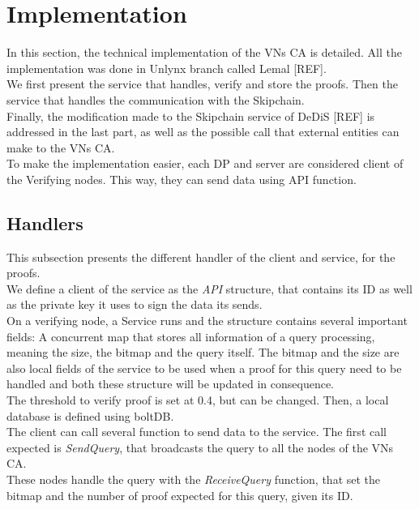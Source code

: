 \documentclass{article}
\begin{document}
\section{Implementation}
In this section, the technical implementation of the VNs CA is detailed. All the implementation was done in Unlynx branch called Lemal [REF].\\
We first present the service that handles, verify and store the proofs. Then the service that handles the communication with the Skipchain.\\
Finally, the modification made to the Skipchain service of DeDiS [REF] is addressed in the last part, as well as the possible call that external entities can make to the VNs CA.\\

To make the implementation easier, each DP and server are considered client of the Verifying nodes. This way, they can send data using API function.\\

\subsection{Handlers}
This subsection presents the different handler of the client and service, for the proofs.\\

We define a client of the service as the \textit{API} structure, that contains its ID as well as the private key it uses to sign the data its sends.\\
On a verifying node, a Service runs and the structure contains several important fields: A concurrent map that stores all information of a query processing, meaning the size, the bitmap and the query itself. The bitmap and the size are also local fields of the service to be used when a proof for this query need to be handled and  both these structure will be updated in consequence.\\
The threshold to verify proof is set at 0.4, but can be changed. Then, a local database is defined using boltDB.\\

The client can call several function to send data to the service. The first call expected is \textit{SendQuery}, that broadcasts the query to all the nodes of the VNs CA.\\
These nodes handle the query with the \textit{ReceiveQuery} function, that set the bitmap and the number of proof expected for this query, given its ID.\\
\end{document}
